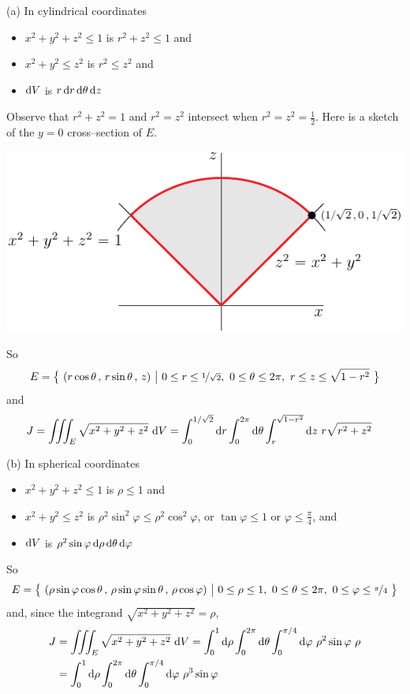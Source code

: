 \begin{solution}
(a)
In cylindrical coordinates
\begin{itemize}
\item
$x^2+y^2+z^2\le 1$ is $r^2+z^2\le 1$ and
\item
$x^2+y^2\le z^2$ is $r^2\le z^2$ and
\item
$\mathrm{d}V$ is $r\,\mathrm{d}r\,\mathrm{d}\theta\,\mathrm{d}z$
\end{itemize}
Observe that $r^2+z^2= 1$ and $r^2= z^2$ intersect when $r^2=z^2=\frac{1}{2}$.
Here is a sketch of the $y=0$ cross--section of $E$.
\begin{center}
     \includegraphics[scale=1.0]{fig/OE11A_8.pdf}
\end{center}
So
\begin{equation*}
E =\Set{(r\cos\theta\,,\,r\sin\theta\,,\,z)}{0\le r\le\nicefrac{1}{\sqrt{2}},\ 
                                             0\le\theta\le2\pi,\ 
                                              r\le z\le \sqrt{1-r^2}}
\end{equation*}
and
\begin{align*}
J &=\iiint_E \sqrt{x^2+y^2+z^2}\ \mathrm{d}V 
   =\int_0^{1/\sqrt{2}}\mathrm{d}r\int_0^{2\pi}\mathrm{d}\theta
           \int_r^{\sqrt{1-r^2}}\mathrm{d}z\ r\sqrt{r^2+z^2}
\end{align*}

(b)
In spherical coordinates
\begin{itemize}
\item
$x^2+y^2+z^2\le 1$ is $\rho\le 1$ and
\item
$x^2+y^2\le z^2$ is $\rho^2\sin^2\varphi\le \rho^2\cos^2\varphi$,
or $\tan\varphi\le 1$ or $\varphi\le\frac{\pi}{4}$, and
\item
$\mathrm{d}V$ is $\rho^2\sin\varphi\,\mathrm{d}\rho\,\mathrm{d}\theta\,\mathrm{d}\varphi$
\end{itemize}
So
\begin{equation*}
E =\Set{(\rho\sin\varphi\cos\theta\,,\,\rho\sin\varphi\sin\theta\,,\,
          \rho\cos\varphi)}{0\le\rho\le 1,\  0\le\theta\le2\pi,\ 
                            0\le \varphi\le \nicefrac{\pi}{4}}
\end{equation*}
and, since the integrand $\sqrt{x^2+y^2+z^2}=\rho$,
\begin{align*}
J &=\iiint_E \sqrt{x^2+y^2+z^2}\ \mathrm{d}V 
   =\int_0^{1}\mathrm{d}\rho\int_0^{2\pi}\mathrm{d}\theta
           \int_0^{\pi/4}\mathrm{d}\varphi\ \rho^2\sin\varphi\ \rho \\
   &=\int_0^{1}\mathrm{d}\rho\int_0^{2\pi}\mathrm{d}\theta
           \int_0^{\pi/4}\mathrm{d}\varphi\ \rho^3\sin\varphi
\end{align*}



\end{solution}
